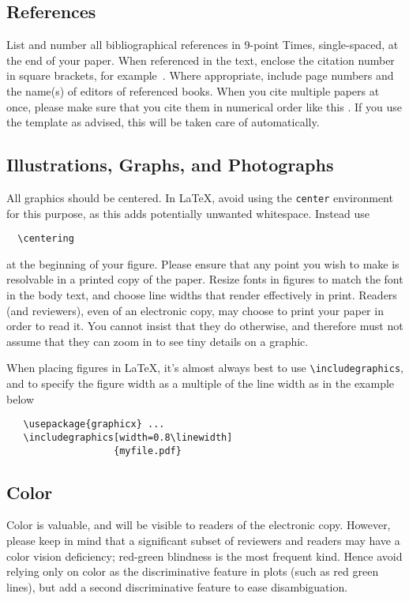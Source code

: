 \subsection{References}

List and number all bibliographical references in 9-point Times, single-spaced, at the end of your paper.
When referenced in the text, enclose the citation number in square brackets, for
example~\cite{Authors14}.
Where appropriate, include page numbers and the name(s) of editors of referenced books.
When you cite multiple papers at once, please make sure that you cite them in numerical order like this \cite{Alpher02,Alpher03,Alpher05,Authors14b,Authors14}.
If you use the template as advised, this will be taken care of automatically.


\subsection{Illustrations, Graphs, and Photographs}

All graphics should be centered.
In \LaTeX, avoid using the \texttt{center} environment for this purpose, as this adds potentially unwanted whitespace.
Instead use
{\small\begin{verbatim}
  \centering
\end{verbatim}}
at the beginning of your figure.
Please ensure that any point you wish to make is resolvable in a printed copy of the paper.
Resize fonts in figures to match the font in the body text, and choose line widths that render effectively in print.
Readers (and reviewers), even of an electronic copy, may choose to print your paper in order to read it.
You cannot insist that they do otherwise, and therefore must not assume that they can zoom in to see tiny details on a graphic.

When placing figures in \LaTeX, it's almost always best to use \verb+\includegraphics+, and to specify the figure width as a multiple of the line width as in the example below
{\small\begin{verbatim}
   \usepackage{graphicx} ...
   \includegraphics[width=0.8\linewidth]
                   {myfile.pdf}
\end{verbatim}
}


\subsection{Color}

Color is valuable, and will be visible to readers of the electronic copy.
However, please keep in mind that a significant subset of reviewers and readers may have a color vision deficiency; red-green blindness is the most frequent kind.
Hence avoid relying only on color as the discriminative feature in plots (such as red \vs green lines), but add a second discriminative feature to ease disambiguation.

